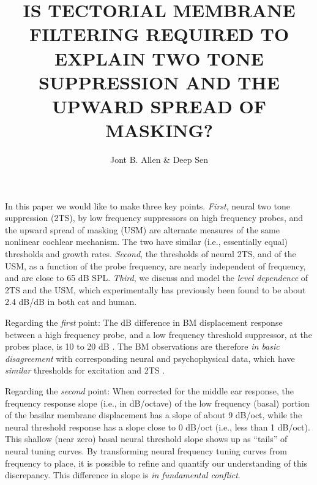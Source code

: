\documentclass{ws-p8-50x6-00}
\begin{document}
\title{
IS TECTORIAL MEMBRANE FILTERING REQUIRED TO EXPLAIN TWO TONE
	SUPPRESSION AND THE UPWARD SPREAD OF MASKING?
}

\author{Jont B. Allen \& Deep Sen}
\address{AT\&T Labs--Research, Florham Park NJ 07932}
\maketitle
\setlength{\baselineskip}{11pt}

In this paper we would like to make three key points. \emph{First}, neural two
tone suppression (2TS), by low frequency suppressors on high frequency probes,
and the upward spread of masking (USM) are alternate measures of the
same nonlinear cochlear mechanism. The two have similar (i.e., essentially equal)
thresholds and growth rates.
\emph{Second}, the thresholds of neural 2TS, and of the USM, as a function of the
probe frequency, are nearly independent of frequency, and are close to 65 dB SPL.
\emph{Third}, we discuss and model the \emph{level dependence} of 2TS and the USM,
which experimentally has previously been found to be about 2.4 dB/dB in both cat
and human.

Regarding the \emph{first} point: 
The dB difference in BM displacement response between a high frequency probe,
and a low frequency threshold suppressor, at the probes place, is 10 to 20 dB
\cite{Ruggero92a,Cooper96b,Geisler97a}.
The BM observations are therefore \emph{in basic disagreement} with corresponding
neural and psychophysical data, which have \emph{similar} thresholds for excitation
and 2TS \cite{Fahey85}.

Regarding the \emph{second} point: When corrected for the middle ear response, the
frequency response slope (i.e., in dB/octave) of the low frequency (basal) portion
of the basilar membrane displacement has a slope of about 9 dB/oct, while the neural
threshold response has a slope close to 0 dB/oct (i.e., less than 1 dB/oct).
This shallow (near zero) basal neural threshold slope shows up as
``tails'' of neural tuning curves.
By transforming neural frequency tuning curves from frequency to place, it is
possible to refine and quantify our understanding of this discrepancy.
This difference in slope is \emph{in fundamental conflict}.
\end{document}
